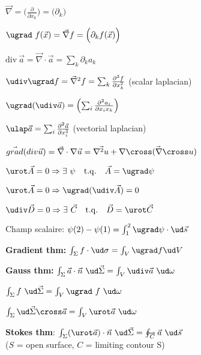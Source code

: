   \squishlist
   \item $\vec \nabla = \Big( \frac{\partial}{\partial x_{k}} \Big) = \Big( \partial_{k} \Big)$
   \item $\ugrad \ f(\vec x) = \vec \nabla f = \Big( \partial_{k} f(\vec x) \Big)$
   \item $\textrm{div} \ \vec a = \vec \nabla \cdot \vec a = \sum_{k} \partial_{k} a_{k}$
   \item $\udiv \ugrad f = \vec \nabla^{2} f = \sum_{k} \frac{\partial^{2} f}{\partial x_{k}^{2}}$ \qquad (scalar laplacian)
   \item $\ugrad (\udiv \vec a) = \left( \sum_{i} \frac{\partial^{2} a_{i}}{\partial x_{i} x_{k}} \right)$
   \item $\ulap \vec a = \sum_{i} \frac{\partial^{2} \vec a}{\partial x_{i}^{2}}$ \qquad (vectorial laplacian)
   \item $\vec{grad}(div\vec{u})= \vec{\nabla}\cdot \nabla\vec{u} =\vec{\nabla^2 u} + \vec{\nabla\cross(\nabla\cross u)}$
  \squishend

  \squishlist
   \item $\urot \vec A = 0 \Rightarrow \exists \ \psi \quad \mathrm{t.q.} \quad \vec A = \ugrad \psi$
   \item $\urot \vec A = 0 \Rightarrow \ugrad (\udiv \vec A) = 0$
   \item $\udiv \vec D = 0 \Rightarrow \exists \ \vec C \quad \mathrm{t.q.} \quad \vec D = \urot \vec C$
   \item Champ scalaire: $\psi(2) - \psi(1) = \int_1^2 \ugrad \psi \cdot \ud \vec s$
   \item \textbf{Gradient thm:} $\int_{\Sigma} f \cdot \ud \sigma = \int_V \ugrad f \ud V$
   \item \textbf{Gauss thm:} $\int_\Sigma \vec a \cdot \vec n \ \ud \vec \Sigma = \int_V \udiv \vec a \ \ud \omega$
   \item $\int_{\Sigma} f \ \ud \vec \Sigma = \int_V \ugrad \ f \ \ud \omega$
   \item $\int_{\Sigma} \ud \vec \Sigma \cross \vec a = \int_{V} \urot \vec a \ \ud \omega$
   \item \textbf{Stokes thm}: $\int_\Sigma (\urot \vec a) \cdot \vec n \ \ud \vec \Sigma = \oint_{\overrightarrow{C}} \vec a \ \ud \vec s$ \\
     ($S$ = open surface, $C$ = limiting contour S)
  \squishend

